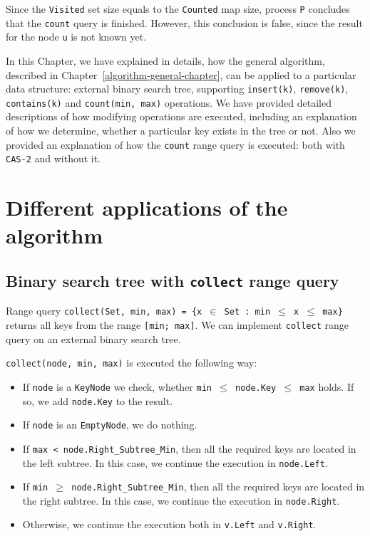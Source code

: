 \documentclass[times, dvipsnames,%
               languages={russian,english} %
              ]{itmo-student-thesis}
\begin{document}
\bigbreak

Since the \texttt{Visited} set size equals to the \texttt{Counted} map size, process \texttt{P} concludes that the \texttt{count} query is finished. However, this conclusion is false, since the result for the node \texttt{u} is not known yet.

\chapterconclusion

In this Chapter, we have explained in details, how the general algorithm, described in Chapter~\ref{algorithm-general-chapter}, can be applied to a particular data structure: external binary search tree, supporting \texttt{insert(k)}, \texttt{remove(k)}, \texttt{contains(k)} and \texttt{count(min, max)} operations. We have provided detailed descriptions of how modifying operations are executed, including an explanation of how we determine, whether a particular key exists in the tree or not. Also we provided an explanation of how the \texttt{count} range query is executed: both with \texttt{CAS-2} and without it.  


\chapter{Different applications of the algorithm}
\label{applicability-chapter}

\section{Binary search tree with \texttt{collect} range query}

Range query \texttt{collect(Set, min, max) = \{x $\in$ Set : min $\leq$ x $\leq$ max\}} returns all keys from the range \texttt{[min; max]}. We can implement \texttt{collect} range query on an external binary search tree.

\texttt{collect(node, min, max)} is executed the following way:

\begin{itemize}
    \item If \texttt{node} is a \texttt{KeyNode} we check, whether \texttt{min $\leq$ node.Key $\leq$ max} holds. If so, we add \texttt{node.Key} to the result.
    
    \item If \texttt{node} is an \texttt{EmptyNode}, we do nothing.
    
    \item If \texttt{max < node.Right\_Subtree\_Min}, then all the required keys are located in the left subtree. In this case, we continue the execution in \texttt{node.Left}.
    
    \item If \texttt{min $\geq$ node.Right\_Subtree\_Min}, then all the required keys are located in the right subtree. In this case, we continue the execution in \texttt{node.Right}.
    
    \item Otherwise, we continue the execution both in \texttt{v.Left} and \texttt{v.Right}.
\end{itemize}
\end{document}
